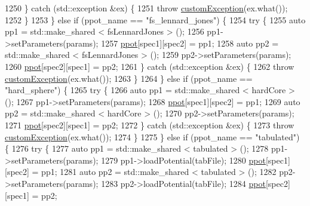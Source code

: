 \begin{DoxyCode}
1250         \} \textcolor{keywordflow}{catch} (std::exception &ex) \{
1251             \textcolor{keywordflow}{throw} \hyperlink{classcustom_exception}{customException}(ex.what());
1252         \}
1253     \} \textcolor{keywordflow}{else} \textcolor{keywordflow}{if} (ppot\_name == \textcolor{stringliteral}{"fs\_lennard\_jones"}) \{
1254         \textcolor{keywordflow}{try} \{
1255             \textcolor{keyword}{auto} pp1 = std::make\_shared < fsLennardJones > ();
1256             pp1->setParameters(params);
1257             \hyperlink{classsim_system_ad2e290b5963f132e6a3a56cee35c8e9f}{ppot}[spec1][spec2] = pp1;
1258             \textcolor{keyword}{auto} pp2 = std::make\_shared < fsLennardJones > ();
1259             pp2->setParameters(params);
1260             \hyperlink{classsim_system_ad2e290b5963f132e6a3a56cee35c8e9f}{ppot}[spec2][spec1] = pp2;
1261         \} \textcolor{keywordflow}{catch} (std::exception &ex) \{
1262             \textcolor{keywordflow}{throw} \hyperlink{classcustom_exception}{customException}(ex.what());
1263         \}
1264     \} \textcolor{keywordflow}{else} \textcolor{keywordflow}{if} (ppot\_name == \textcolor{stringliteral}{"hard\_sphere"}) \{
1265         \textcolor{keywordflow}{try} \{
1266             \textcolor{keyword}{auto} pp1 = std::make\_shared < hardCore > ();
1267             pp1->setParameters(params);
1268             \hyperlink{classsim_system_ad2e290b5963f132e6a3a56cee35c8e9f}{ppot}[spec1][spec2] = pp1;
1269             \textcolor{keyword}{auto} pp2 = std::make\_shared < hardCore > ();
1270             pp2->setParameters(params);
1271             \hyperlink{classsim_system_ad2e290b5963f132e6a3a56cee35c8e9f}{ppot}[spec2][spec1] = pp2;
1272         \} \textcolor{keywordflow}{catch} (std::exception &ex) \{
1273             \textcolor{keywordflow}{throw} \hyperlink{classcustom_exception}{customException}(ex.what());
1274         \}
1275     \} \textcolor{keywordflow}{else} \textcolor{keywordflow}{if} (ppot\_name == \textcolor{stringliteral}{"tabulated"}) \{
1276         \textcolor{keywordflow}{try} \{
1277             \textcolor{keyword}{auto} pp1 = std::make\_shared < tabulated > ();
1278             pp1->setParameters(params);
1279             pp1->loadPotential(tabFile);
1280             \hyperlink{classsim_system_ad2e290b5963f132e6a3a56cee35c8e9f}{ppot}[spec1][spec2] = pp1;
1281             \textcolor{keyword}{auto} pp2 = std::make\_shared < tabulated > ();
1282             pp2->setParameters(params);
1283             pp2->loadPotential(tabFile);
1284             \hyperlink{classsim_system_ad2e290b5963f132e6a3a56cee35c8e9f}{ppot}[spec2][spec1] = pp2;

\end{DoxyCode}
